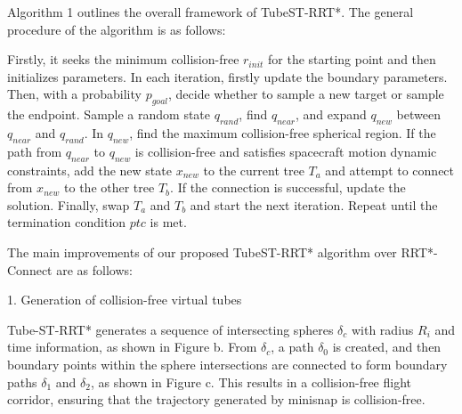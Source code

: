 \documentclass[times,authoryear]{elsarticle}
\newcommand{\Input}{\item[\textbf{Input:}]}
\renewcommand{\Output}{\item[\textbf{Output:}]}
\begin{document}
Algorithm 1 outlines the overall framework of TubeST-RRT*. The general procedure of the algorithm is as follows:

Firstly, it seeks the minimum collision-free $r_{init}$ for the starting point and then initializes parameters.
In each iteration, firstly update the boundary parameters. Then, with a probability $p_{goal}$, decide whether to sample a new target or sample the endpoint. Sample a random state $q_{rand}$, find $q_{near}$, and expand $q_{new}$ between $q_{near}$ and $q_{rand}$. In $q_{new}$, find the maximum collision-free spherical region. If the path from $q_{near}$ to $q_{new}$ is collision-free and satisfies spacecraft motion dynamic constraints, add the new state $x_{new}$ to the current tree $T_{a}$ and attempt to connect from $x_{new}$ to the other tree $T_{b}$. If the connection is successful, update the solution. Finally, swap $T_{a}$ and $T_{b}$ and start the next iteration. Repeat until the termination condition $ptc$ is met.


		

The main improvements of our proposed TubeST-RRT* algorithm over RRT*-Connect are as follows:

1. Generation of collision-free virtual tubes

Tube-ST-RRT* generates a sequence of intersecting spheres $\delta_{c}$ with radius $R_i$ and time information, as shown in Figure b. From $\delta_{c}$, a path $\delta_{0}$ is created, and then boundary points within the sphere intersections are connected to form boundary paths $\delta_{1}$ and $\delta_{2}$, as shown in Figure c. This results in a collision-free flight corridor, ensuring that the trajectory generated by minisnap is collision-free.
\end{document}
